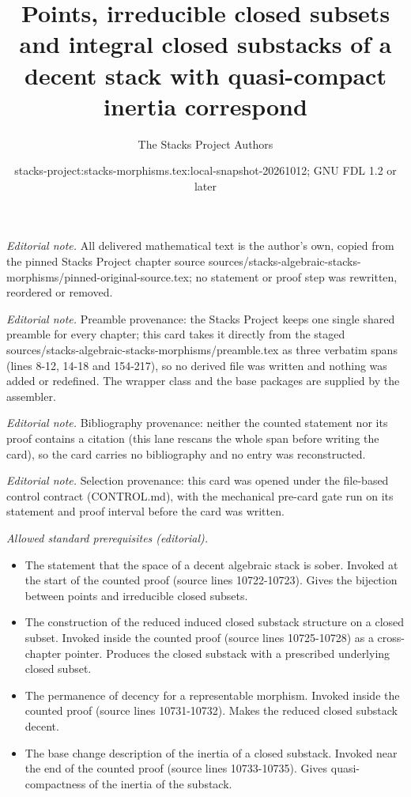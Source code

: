 \documentclass[10pt,a4paper]{amsart}
\title{Points, irreducible closed subsets and integral closed substacks of a decent stack with quasi-compact inertia correspond}
\author{The Stacks Project Authors}
\date{stacks-project:stacks-morphisms.tex:local-snapshot-20261012; GNU FDL 1.2 or later}
\theoremstyle{plain}
\theoremstyle{definition}
\theoremstyle{remark}
\numberwithin{equation}{subsection}
\begin{document}
\maketitle
\noindent\textit{Editorial note.} All delivered mathematical text is the author's own, copied from the pinned Stacks Project chapter source sources/stacks-algebraic-stacks-morphisms/pinned-original-source.tex; no statement or proof step was rewritten, reordered or removed.\par\medskip
\noindent\textit{Editorial note.} Preamble provenance: the Stacks Project keeps one single shared preamble for every chapter; this card takes it directly from the staged sources/stacks-algebraic-stacks-morphisms/preamble.tex as three verbatim spans (lines 8-12, 14-18 and 154-217), so no derived file was written and nothing was added or redefined. The wrapper class and the base packages are supplied by the assembler.\par\medskip
\noindent\textit{Editorial note.} Bibliography provenance: neither the counted statement nor its proof contains a citation (this lane rescans the whole span before writing the card), so the card carries no bibliography and no entry was reconstructed.\par\medskip
\noindent\textit{Editorial note.} Selection provenance: this card was opened under the file-based control contract (CONTROL.md), with the mechanical pre-card gate run on its statement and proof interval before the card was written.\par\medskip
\noindent\textit{Allowed standard prerequisites (editorial).}\begin{itemize}
\item The statement that the space of a decent algebraic stack is sober. Invoked at the start of the counted proof (source lines 10722-10723). Gives the bijection between points and irreducible closed subsets.
\item The construction of the reduced induced closed substack structure on a closed subset. Invoked inside the counted proof (source lines 10725-10728) as a cross-chapter pointer. Produces the closed substack with a prescribed underlying closed subset.
\item The permanence of decency for a representable morphism. Invoked inside the counted proof (source lines 10731-10732). Makes the reduced closed substack decent.
\item The base change description of the inertia of a closed substack. Invoked near the end of the counted proof (source lines 10733-10735). Gives quasi-compactness of the inertia of the substack.
\end{itemize}\medskip
\end{document}
